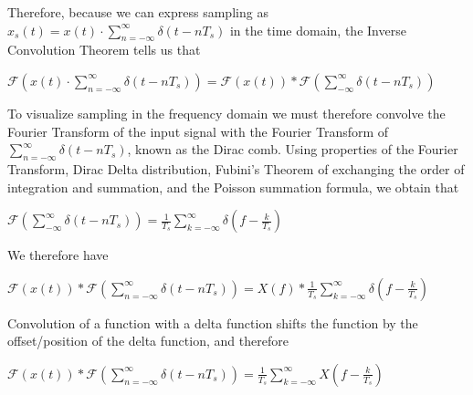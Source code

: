 \documentclass{article}
\begin{document}
Therefore, because we can express sampling as $x_s(t) = x(t) \cdot \displaystyle\sum_{n=-\infty}^{\infty} \delta (t-nT_s)$ in the time domain, the Inverse Convolution Theorem tells us that %
\begin{center}
    \begin{math}
        \mathcal{F}\left(x(t) \cdot \displaystyle\sum_{n=-\infty}^{\infty} \delta (t-nT_s)\right) = \mathcal{F}(x(t)) * \mathcal{F}\left(\displaystyle \sum_{-\infty}^{\infty} \delta (t-nT_s) \right)
    \end{math}  
\end{center}

To visualize sampling in the frequency domain we must therefore convolve the Fourier Transform of the input signal with the Fourier Transform of $\displaystyle\sum_{n=-\infty}^{\infty} \delta (t-nT_s)$, known as the Dirac comb.
Using properties of the Fourier Transform, Dirac Delta distribution, Fubini's Theorem of exchanging the order of integration and summation, 
and the Poisson summation formula, 
we obtain that 
\begin{center}
    \begin{math}
        \mathcal{F}\left(\displaystyle\sum_{-\infty}^{\infty} \delta (t-nT_s)\right) = \frac{1}{T_s} \displaystyle\sum_{k = -\infty}^{\infty} \delta \left( f - \frac{k}{T_s} \right)
    \end{math}  
\end{center}
We therefore have
\begin{center}
    \begin{math}
        \mathcal{F}(x(t)) * \mathcal{F}\left(\displaystyle \sum_{n=-\infty}^{\infty} \delta (t-nT_s) \right) = X(f) * \frac{1}{T_s}\displaystyle \sum_{k = -\infty}^{\infty} \delta \left( f - \frac{k}{T_s} \right)
    \end{math}  
\end{center}
Convolution of a function with a delta function shifts the function by the offset/position of the delta function, and therefore 
\begin{center}
    \begin{math}
        \mathcal{F}(x(t)) * \mathcal{F}\left(\displaystyle \sum_{n=-\infty}^{\infty} \delta (t-nT_s) \right) 
        = 
        \frac{1}{T_s} \displaystyle\sum_{k=-\infty}^{\infty}X\left(f - \frac{k}{T_s} \right)
    \end{math}  
\end{center}
\end{document}
